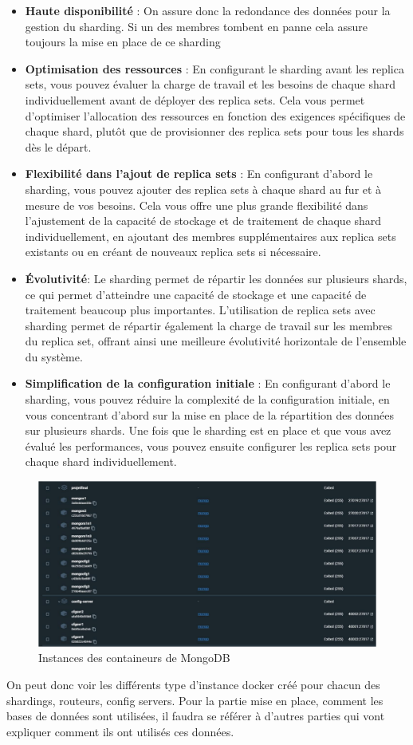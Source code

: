 \begin{itemize}
    \item \textbf{Haute disponibilité} : On assure donc la redondance des données pour la gestion du sharding. Si
    un des membres tombent en panne cela assure toujours la mise en place de ce sharding
    \item \textbf{Optimisation des ressources }: En configurant le sharding avant les replica sets, vous pouvez
    évaluer la charge de travail et les besoins de chaque shard individuellement avant de déployer
    des replica sets. Cela vous permet d'optimiser l'allocation des ressources en fonction des
    exigences spécifiques de chaque shard, plutôt que de provisionner des replica sets pour tous les
    shards dès le départ.
    \item \textbf{Flexibilité dans l'ajout de replica sets }: En configurant d'abord le sharding, vous pouvez ajouter
    des replica sets à chaque shard au fur et à mesure de vos besoins. Cela vous offre une plus
    grande flexibilité dans l'ajustement de la capacité de stockage et de traitement de chaque shard
    individuellement, en ajoutant des membres supplémentaires aux replica sets existants ou en
    créant de nouveaux replica sets si nécessaire.
    \item \textbf{Évolutivité}: Le sharding permet de répartir les données sur plusieurs shards, ce qui permet
    d'atteindre une capacité de stockage et une capacité de traitement beaucoup plus importantes.
    L'utilisation de replica sets avec sharding permet de répartir également la charge de travail sur
    les membres du replica set, offrant ainsi une meilleure évolutivité horizontale de l'ensemble du
    système.
    \item \textbf{Simplification de la configuration initiale }: En configurant d'abord le sharding, vous pouvez
    réduire la complexité de la configuration initiale, en vous concentrant d'abord sur la mise en
    place de la répartition des données sur plusieurs shards. Une fois que le sharding est en place et
    que vous avez évalué les performances, vous pouvez ensuite configurer les replica sets pour
    chaque shard individuellement.
\end{itemize}

\begin{figure}[H]
    \centering
    \includegraphics[width=\textwidth]{./img/alex.png}
    \caption{Instances des containeurs de MongoDB}
    \label{fig:alex-container-instance}
\end{figure}

On peut donc voir les différents type d'instance docker créé pour chacun des shardings, routeurs, config
servers.
Pour la partie mise en place, comment les bases de données sont utilisées, il faudra se référer à d'autres
parties qui vont expliquer comment ils ont utilisés ces données.

